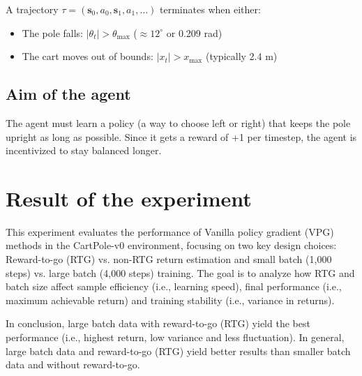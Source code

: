 \documentclass{article} %
\begin{document}
A trajectory $\tau = (\mathbf{s}_0, a_0, \mathbf{s}_1, a_1, \dots)$ terminates when either:
\begin{itemize}
    \item The pole falls: $|\theta_t| > \theta_\text{max}$ ($\approx 12^\circ$ or 0.209 rad)
    \item The cart moves out of bounds: $|x_t| > x_\text{max}$ (typically 2.4 m)
\end{itemize}

\subsection{Aim of the agent}
The agent must learn a policy (a way to choose left or right) that keeps the pole upright as long as possible. Since it gets a reward of +1 per timestep, the agent is incentivized to stay balanced longer.

\section{Result of the experiment}
This experiment evaluates the performance of Vanilla policy gradient (VPG) methods in the CartPole-v0 environment, focusing on two key design choices: Reward-to-go (RTG) vs. non-RTG return estimation and small batch (1,000 steps) vs. large batch (4,000 steps) training. The goal is to analyze how RTG and batch size affect sample efficiency (i.e., learning speed), final performance (i.e., maximum achievable return) and training stability (i.e., variance in returns).

In conclusion, large batch data with reward-to-go (RTG) yield the best performance (i.e., highest return, low variance and less fluctuation). In general, large batch data and reward-to-go (RTG) yield better results than smaller batch data and without reward-to-go.
\end{document}
